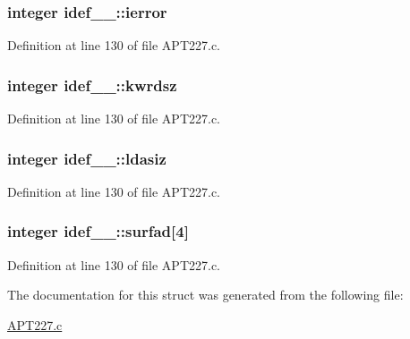 \subsubsection[{\texorpdfstring{ierror}{ierror}}]{\setlength{\rightskip}{0pt plus 5cm}integer idef\+\_\+\_\+\+::ierror}\hypertarget{structidef__1___a32d73a01b8164649d8426d05b6bf89b8}{}\label{structidef__1___a32d73a01b8164649d8426d05b6bf89b8}


Definition at line 130 of file A\+P\+T227.\+c.

\subsubsection[{\texorpdfstring{kwrdsz}{kwrdsz}}]{\setlength{\rightskip}{0pt plus 5cm}integer idef\+\_\+\_\+\+::kwrdsz}\hypertarget{structidef__1___af8f2880406b732e94ecc1363b9c4c7ae}{}\label{structidef__1___af8f2880406b732e94ecc1363b9c4c7ae}


Definition at line 130 of file A\+P\+T227.\+c.

\subsubsection[{\texorpdfstring{ldasiz}{ldasiz}}]{\setlength{\rightskip}{0pt plus 5cm}integer idef\+\_\+\_\+\+::ldasiz}\hypertarget{structidef__1___acef5d4b0e87c383243d031727bee56fe}{}\label{structidef__1___acef5d4b0e87c383243d031727bee56fe}


Definition at line 130 of file A\+P\+T227.\+c.

\subsubsection[{\texorpdfstring{surfad}{surfad}}]{\setlength{\rightskip}{0pt plus 5cm}integer idef\+\_\+\_\+\+::surfad\mbox{[}4\mbox{]}}\hypertarget{structidef__1___ac94153f7cdfe5da1dcf8ee3efce9726c}{}\label{structidef__1___ac94153f7cdfe5da1dcf8ee3efce9726c}


Definition at line 130 of file A\+P\+T227.\+c.



The documentation for this struct was generated from the following file\+:\begin{DoxyCompactItemize}
\item 
\hyperlink{APT227_8c}{A\+P\+T227.\+c}\end{DoxyCompactItemize}
